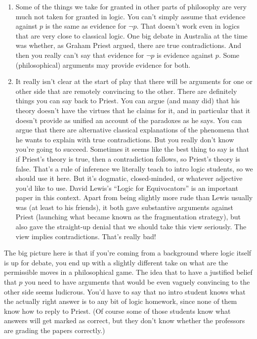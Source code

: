 \documentclass[
]{article}
\providecommand{\tightlist}{%
  \setlength{\itemsep}{0pt}\setlength{\parskip}{0pt}}
\begin{document}
\begin{enumerate}
\def\labelenumi{\arabic{enumi}.}
\tightlist
\item
  Some of the things we take for granted in other parts of philosophy
  are very much not taken for granted in logic. You can't simply assume
  that evidence against \(p\) is the same as evidence for \(\neg p\).
  That doesn't work even in logics that are very close to classical
  logic. One big debate in Australia at the time was whether, as Graham
  Priest argued, there are true contradictions. And then you really
  can't say that evidence for \(\neg p\) is evidence against \(p\). Some
  (philosophical) arguments may provide evidence for both.
\item
  It really isn't clear at the start of play that there will be
  arguments for one or other side that are remotely convincing to the
  other. There are definitely things you can say back to Priest. You can
  argue (and many did) that his theory doesn't have the virtues that he
  claims for it, and in particular that it doesn't provide as unified an
  account of the paradoxes as he says. You can argue that there are
  alternative classical explanations of the phenomena that he wants to
  explain with true contradictions. But you really don't know you're
  going to succeed. Sometimes it seems like the best thing to say is
  that if Priest's theory is true, then a contradiction follows, so
  Priest's theory is false. That's a rule of inference we literally
  teach to intro logic students, so we should use it here. But it's
  dogmatic, closed-minded, or whatever adjective you'd like to use.
  David Lewis's ``Logic for Equivocators'' is an important paper in this
  context. Apart from being slightly more rude than Lewis usually was
  (at least to his friends), it both gave substantive arguments against
  Priest (launching what became known as the fragmentation strategy),
  but also gave the straight-up denial that we should take this view
  seriously. The view implies contradictions. That's really bad!
\end{enumerate}

The big picture here is that if you're coming from a background where
logic itself is up for debate, you end up with a slightly different take
on what are the permissible moves in a philosophical game. The idea that
to have a justified belief that \(p\) you need to have arguments that
would be even vaguely convincing to the other side seems ludicrous.
You'd have to say that no intro student knows what the actually right
answer is to any bit of logic homework, since none of them know how to
reply to Priest. (Of course some of those students know what answers
will get marked as correct, but they don't know whether the professors
are grading the papers correctly.)
\end{document}
